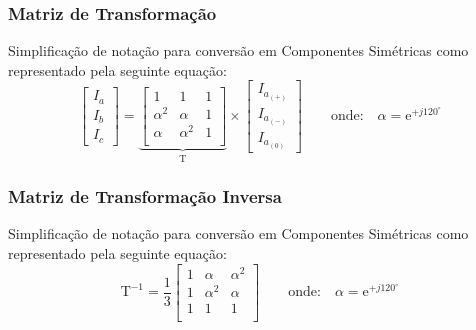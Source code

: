 \documentclass{article}
\begin{document}
\subsubsection{Matriz de Transformação}
\begin{definition}
    Simplificação de notação para conversão em Componentes Simétricas como representado pela seguinte equação:
    \begin{equation}
        \boxed{
            \begin{bmatrix}
                I_{a}\\
                I_{b}\\
                I_{c}
            \end{bmatrix}
            = 
            \underbrace{
                \begin{bmatrix}
                    1 & 1 & 1\\
                    \alpha^{2} & \alpha     & 1\\
                    \alpha     & \alpha^{2} & 1\\
                \end{bmatrix}
            }_{\text{T}}
            \times 
            \begin{bmatrix}
                I_{a_{(+)}}\\
                I_{a_{(-)}}\\
                I_{a_{(0)}}
            \end{bmatrix}
        }
        \qquad
        \text{onde:}
        \quad
        \alpha = \text{e}^{+j120^{\circ}}
    \end{equation}
\end{definition}

\subsubsection{Matriz de Transformação Inversa}
\begin{definition}
    Simplificação de notação para conversão em Componentes Simétricas como representado pela seguinte equação:
    \begin{equation}
        \boxed{
            \text{T}^{-1}
            = \frac{1}{3}
            \begin{bmatrix}
                1 & \alpha     & \alpha^{2}\\
                1 & \alpha^{2} & \alpha\\
                1 & 1 & 1\\
            \end{bmatrix}
        }
        \qquad
        \text{onde:}
        \quad
        \alpha = \text{e}^{+j120^{\circ}}
    \end{equation}
\end{definition}
\end{document}
